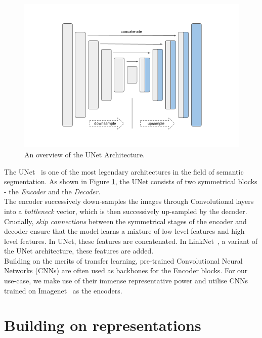 \documentclass[letterpaper, 10 pt, conference]{ieeeconf}  %
\begin{document}
\begin{figure}[thpb]
    \centering
    \includegraphics[scale=0.375]{unet_architecture.png}
    \caption{An overview of the UNet Architecture.}
    \label{unet:arch}
    \vspace{-4mm}
\end{figure} 

The UNet~\cite{10.1007/978-3-319-24574-4_28} is one of the most legendary architectures in the field of semantic segmentation. As shown in Figure \ref{unet:arch}, the UNet consists of two symmetrical blocks - the \textit{Encoder} and the \textit{Decoder}. 
\\
The encoder successively down-samples the images through Convolutional layers into a \textit{bottleneck} vector, which is then successively up-sampled by the decoder. \\
Crucially, \textit{skip connections} between the symmetrical stages of the encoder and decoder ensure that the model learns a mixture of low-level features and high-level features. In UNet, these features are concatenated. In LinkNet~\cite{8305148}, a variant of the UNet architecture, these features are added. \\ 

Building on the merits of transfer learning, pre-trained Convolutional Neural Networks (CNNs) are often used as backbones for the Encoder blocks. For our use-case, we make use of their immense representative power and utilise CNNs trained on Imagenet~\cite{5206848} as the encoders.

\section{Building on representations}
\label{encoder}
\end{document}
